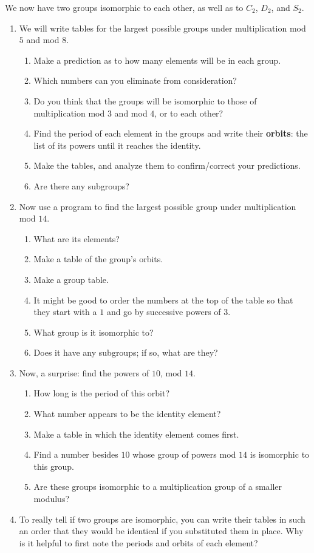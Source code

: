 \documentclass[../textbook.tex]{subfiles}
\begin{document}
\noindent We now have two groups isomorphic to each other, as well as to $C_2$, $D_2$, and $S_2$.

\begin{enumerate}
\setcounter{enumi}{\value{problem_i}}
\item We will write tables for the largest possible groups under multiplication mod $5$ and mod $8$.
\begin{enumerate}
\item Make a prediction as to how many elements will be in each group.
\item Which numbers can you eliminate from consideration?
\item Do you think that the groups will be isomorphic to those of multiplication mod $3$ and mod $4$, or to each other?
\item Find the period of each element in the groups and write their \textbf{orbits}: the list of its powers until it reaches the identity.
\item Make the tables, and analyze them to confirm/correct your predictions.
\item Are there any subgroups?
\end{enumerate}
\item Now use a program to find the largest possible group under multiplication mod $14$.
\begin{enumerate}
\item What are its elements?
\item Make a table of the group's orbits.
\item Make a group table.
\item It might be good to order the numbers at the top of the table so that they start with a $1$ and go by successive powers of $3$.
\item What group is it isomorphic to?
\item Does it have any subgroups; if so, what are they?
\end{enumerate}
\item Now, a surprise: find the powers of $10$, mod $14$.
\begin{enumerate}
\item How long is the period of this orbit?
\item What number appears to be the identity element?
\item Make a table in which the identity element comes first.
\item Find a number besides $10$ whose group of powers mod $14$ is isomorphic to this group.
\item Are these groups isomorphic to a multiplication group of a smaller modulus?
\end{enumerate}
\item To really tell if two groups are isomorphic, you can write their tables in such an order that they would be identical if you substituted them in place. Why is it helpful to first note the periods and orbits of each element?
\setcounter{problem_i}{\value{enumi}}
\end{enumerate}
\end{document}
